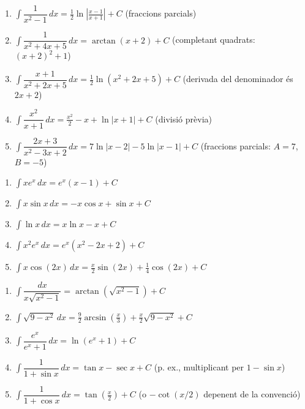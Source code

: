 \documentclass[12pt]{article}
\begin{document}
\begin{solucio}
\begin{enumerate}
    \item $\displaystyle \int \dfrac{1}{x^2-1}\,dx = \frac{1}{2}\ln\left|\frac{x-1}{x+1}\right| + C$ (fraccions parcials)
    \item $\displaystyle \int \dfrac{1}{x^2+4x+5}\,dx = \arctan(x+2) + C$ (completant quadrats: $(x+2)^2+1$)
    \item $\displaystyle \int \dfrac{x+1}{x^2+2x+5}\,dx = \frac{1}{2}\ln(x^2+2x+5) + C$ (derivada del denominador és $2x+2$)
    \item $\displaystyle \int \dfrac{x^2}{x+1}\,dx = \frac{x^2}{2} - x + \ln|x+1| + C$ (divisió prèvia)
    \item $\displaystyle \int \dfrac{2x+3}{x^2-3x+2}\,dx = 7\ln|x-2| - 5\ln|x-1| + C$ (fraccions parcials: $A=7$, $B=-5$)
\end{enumerate}
\end{solucio}

\begin{solucio}
\begin{enumerate}
    \item $\displaystyle \int x e^x\,dx = e^x(x-1) + C$
    \item $\displaystyle \int x \sin x\,dx = -x\cos x + \sin x + C$
    \item $\displaystyle \int \ln x\,dx = x\ln x - x + C$
    \item $\displaystyle \int x^2 e^x\,dx = e^x(x^2 - 2x + 2) + C$
    \item $\displaystyle \int x \cos(2x)\,dx = \frac{x}{2}\sin(2x) + \frac{1}{4}\cos(2x) + C$
\end{enumerate}
\end{solucio}

\begin{solucio}
\begin{enumerate}
    \item $\displaystyle \int \dfrac{dx}{x\sqrt{x^2-1}} = \arctan(\sqrt{x^2-1}) + C$
    \item $\displaystyle \int \sqrt{9-x^2}\,dx = \frac{9}{2}\arcsin\left(\frac{x}{3}\right) + \frac{x}{2}\sqrt{9-x^2} + C$
    \item $\displaystyle \int \dfrac{e^x}{e^x+1}\,dx = \ln(e^x+1) + C$
    \item $\displaystyle \int \dfrac{1}{1+\sin x}\,dx = \tan x - \sec x + C$ (p. ex., multiplicant per $1-\sin x$)
    \item $\displaystyle \int \dfrac{1}{1+\cos x}\,dx = \tan\left(\frac{x}{2}\right) + C$ (o $-\cot(x/2)$ depenent de la convenció)
\end{enumerate}
\end{solucio}
\end{document}
